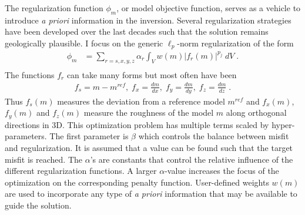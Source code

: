 The regularization function $\phi_m$, or model objective function, serves as a vehicle to introduce \emph{a priori} information in the inversion.
Several regularization strategies have been developed over the last decades such that the solution remains geologically plausible.
I focus on the generic $\ell_p$-norm regularization of the form
\begin{equation}
\begin{split}\label{intSmall}
\phi_m &= \sum_{r=s,x,y,z} \alpha_r \int_V w(m) |f_r (m)|^{p_j} \;dV\;. \\
\end{split}
\end{equation}
The functions $f_r$ can take many forms but most often have been
\begin{equation}
\begin{split}\label{fj}
f_s= m-m^{ref},\;f_x= \frac{d m}{dx},\; f_y= \frac{d m}{dy},\;f_z= \frac{d m}{dz}\;.
\end{split}
\end{equation}
Thus $f_s(m)$ measures the deviation from a reference model $m^{ref}$ and $f_x(m)$, $f_y(m)$ and $f_z(m)$ measure the roughness of the model $m$ along orthogonal directions in 3D.  
This optimization problem has multiple terms scaled by hyper-parameters. The first parameter is $\beta$ which controls the balance between misfit and regularization. It is assumed that a value can be found such that the target misfit is reached.
The $\alpha$'s are constants that control the relative influence of the different regularization functions. A larger $\alpha$-value increases the focus of the optimization on the corresponding penalty function.
User-defined weights $w(m)$ are used to incorporate any type of \emph{a priori} information that may be available to guide the solution.
 
